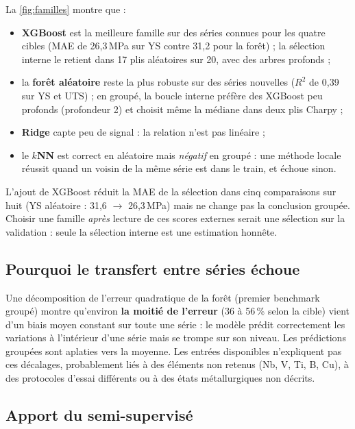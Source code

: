 \documentclass[11pt,a4paper]{article}
\begin{document}
La \cref{fig:familles} montre que :
\begin{itemize}
  \item \textbf{XGBoost} est la meilleure famille sur des séries connues pour les quatre cibles (MAE de 26,3\,MPa sur YS contre 31,2 pour la forêt) ; la sélection interne le retient dans 17 plis aléatoires sur 20, avec des arbres profonds ;
  \item la \textbf{forêt aléatoire} reste la plus robuste sur des séries nouvelles ($R^2$ de 0,39 sur YS et UTS) ; en groupé, la boucle interne préfère des XGBoost peu profonds (profondeur 2) et choisit même la médiane dans deux plis Charpy ;
  \item \textbf{Ridge} capte peu de signal : la relation n'est pas linéaire ;
  \item le \textbf{$k$NN} est correct en aléatoire mais \emph{négatif} en groupé : une méthode locale réussit quand un voisin de la même série est dans le train, et échoue sinon.
\end{itemize}
L'ajout de XGBoost réduit la MAE de la sélection dans cinq comparaisons sur huit
(YS aléatoire : 31,6 $\rightarrow$ 26,3\,MPa) mais ne change pas la conclusion
groupée. Choisir une famille \emph{après} lecture de ces scores externes serait
une sélection sur la validation : seule la sélection interne est une estimation
honnête.

\subsection{Pourquoi le transfert entre séries échoue}

Une décomposition de l'erreur quadratique de la forêt (premier benchmark groupé)
montre qu'environ \textbf{la moitié de l'erreur} (36 à 56\,\% selon la cible)
vient d'un biais moyen constant sur toute une série : le modèle prédit
correctement les variations à l'intérieur d'une série mais se trompe sur son
niveau. Les prédictions groupées sont \og aplaties \fg{} vers la moyenne. Les
entrées disponibles n'expliquent pas ces décalages, probablement liés à des
éléments non retenus (Nb, V, Ti, B, Cu), à des protocoles d'essai différents ou à
des états métallurgiques non décrits.

\subsection{Apport du semi-supervisé}
\end{document}
